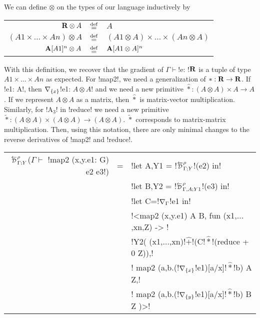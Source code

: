 We can define $\otimes$ on the types of our language inductively by

\begin{tabular}{r c l}
    $\mathbf{R} \otimes A$ & $\stackrel {\mathrm{def}}=$ & $A$ \\
    $(A1 \times \ldots \times An)\otimes A$ & $\stackrel {\mathrm{def}}=$ & $(A1\otimes A) \times \ldots \times (An \otimes A)$ \\
    $\mathbf{A}[A1]^{n} \otimes A$ & $\stackrel {\mathrm{def}}=$ & $\mathbf{A}[A1\otimes A]^{n}$
\end{tabular}

With this definition, we recover that the gradient of $\Gamma \vdash$!e: !$\mathbf{R}$ is a tuple of type $A1\times\ldots\times An$ as expected.
For !map2!, we need a generalization of $*:\mathbf{R}\to\mathbf{R}$. 
If !e1: A!, then $\nabla_{\{x\}}$!e1: $A\otimes A$! and we need a new primitive $\widehat{*}:(A\otimes A) \times A \to A$.
If we represent $A\otimes A$ as a matrix, then $\widehat{*}$ is matrix-vector multiplication.
Similarly, for !A$_{3}$! in !reduce! we need a new primitive $\widetilde{*}:(A\otimes A)\times(A\otimes A) \to (A\otimes A)$.
$\widetilde{*}$ corresponds to matrix-matrix multiplication.
Then, using this notation, there are only minimal changes to the reverse derivatives of !map2! and !reduce!.

\begin{center}
\begin{tabular}{r c l}
    $\directD{\rho}{\Gamma}{Y}$($\Gamma\vdash $ !map2 (x,y.e1: G) e2 e3!) &=&  
    !let A,Y1 = !$\directD{\rho}{\Gamma}{Y}$!(e2) in! \\
    && !let B,Y2 = !$\directD{\rho}{\Gamma,A}{Y1}$!(e3) in! \\
    && !let C=!$\nabla_{\Gamma}$!e1 in!\\
    && !<map2 (x,y.e1) A B, fun (x1,$\ldots$,xn,Z) -> !\\
    && !Y2( (x1,$\ldots$,xn)!$\widehat{+}$!(C!$\widehat{*}$!(reduce + 0 Z)),!\\
    && \quad\quad! map2 (a,b.(!$\nabla_{\{x\}}$!e1)[a/x]!$\widehat{*}$!b) A Z,!\\
    && \quad\quad! map2 (a,b.(!$\nabla_{\{y\}}$!e1)[a/x]!$\widehat{*}$!b) B Z )>!\\
    \end{tabular}
    \end{center}

